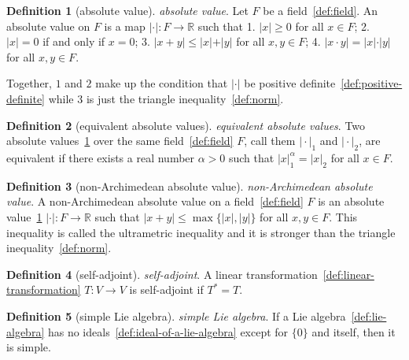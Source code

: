 \documentclass[12pt,a4paper]{article}
\theoremstyle{definition}
\newtheorem{definition}{Definition}
\begin{document}
\begin{definition}[absolute value]\label{def:absolute-value}
\emph{absolute value}. Let $F$ be a field~\ref{def:field}. An absolute value on $F$ is a map $\vert \cdot\vert :F\to \mathbb R$ such that 
1. $\vert x\vert  \geq 0$ for all $x\in F$;
2. $\vert x\vert  = 0$ if and only if $x=0$;
3. $\vert x+y\vert  \leq \vert x\vert  + \vert y\vert$ for all $x,y\in F$;
4. $\vert x\cdot y\vert  = \vert x\vert \cdot \vert y\vert$ for all $x,y\in F$.

Together, $1$ and $2$ make up the condition that $\vert \cdot\vert$ be positive definite~\ref{def:positive-definite} while $3$ is just the triangle inequality~\ref{def:norm}.
\end{definition}

\begin{definition}[equivalent absolute values]\label{def:equivalent-absolute-values}
\emph{equivalent absolute values}. Two absolute values~\ref{def:absolute-value} over the same field~\ref{def:field} $F$, call them $\vert \cdot\vert _1$ and $\vert \cdot\vert _2$, are equivalent if there exists a real number $\alpha>0$ such that $\vert x\vert _1^\alpha = \vert x\vert _2$ for all $x\in F$.
\end{definition}

\begin{definition}[non-Archimedean absolute value]\label{def:non-archimedean-absolute-value}
\emph{non-Archimedean absolute value}. A non-Archimedean absolute value on a field~\ref{def:field} $F$ is an absolute value~\ref{def:absolute-value} $\vert \cdot\vert :F\to \mathbb R$ such that $\vert x+y\vert \leq\max\{\vert x\vert ,\vert y\vert \}$ for all $x,y\in F$. This inequality is called the ultrametric inequality and it is stronger than the triangle inequality~\ref{def:norm}.
\end{definition}

\begin{definition}[self-adjoint]\label{def:self-adjoint}
\emph{self-adjoint}. A linear transformation~\ref{def:linear-transformation} $T:V\to V$ is self-adjoint if $T^*=T$.
\end{definition}

\begin{definition}[simple Lie algebra]\label{def:simple-lie-algebra}
\emph{simple Lie algebra}. If a Lie algebra~\ref{def:lie-algebra} has no ideals~\ref{def:ideal-of-a-lie-algebra} except for $\{0\}$ and itself, then it is simple.
\end{definition}
\end{document}
